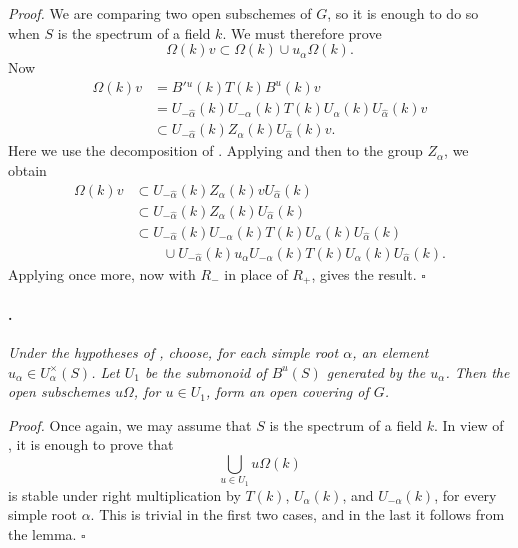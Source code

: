 \textit{Proof.}
We are comparing two open subschemes of \(G\), so it is enough to do
so when \(S\) is the spectrum of a field \(k\). We must therefore
prove
\[
  \Omega(k)v\subset\Omega(k)\cup u_\alpha\Omega(k).
\]
Now
\[
\begin{aligned}
  \Omega(k)v
  &=B'{}^u(k)T(k)B^u(k)v\\
  &=U_{-\widehat\alpha}(k)U_{-\alpha}(k)T(k)
    U_\alpha(k)U_{\widehat\alpha}(k)v\\
  &\subset
    U_{-\widehat\alpha}(k)Z_\alpha(k)
    U_{\widehat\alpha}(k)v.
\end{aligned}
\]
Here we use the decomposition of . Applying 
\textup{} and then  to the group \(Z_\alpha\), we obtain
\[
\begin{aligned}
  \Omega(k)v
  &\subset
    U_{-\widehat\alpha}(k)Z_\alpha(k)v
    U_{\widehat\alpha}(k)\\
  &\subset
    U_{-\widehat\alpha}(k)Z_\alpha(k)
    U_{\widehat\alpha}(k)\\
  &\subset
    U_{-\widehat\alpha}(k)U_{-\alpha}(k)T(k)
    U_\alpha(k)U_{\widehat\alpha}(k)\\
  &\qquad\cup
    U_{-\widehat\alpha}(k)u_\alpha U_{-\alpha}(k)T(k)
    U_\alpha(k)U_{\widehat\alpha}(k).
\end{aligned}
\]
Applying  \textup{} once more, now with \(R_-\) in place
of \(R_+\), gives the result.
\hfill\(\square\)

\paragraph{.}
\textit{Under the hypotheses of , choose, for each simple
root \(\alpha\), an element
\(u_\alpha\in U_\alpha^\times(S)\). Let \(U_1\) be the submonoid of
\(B^u(S)\) generated by the \(u_\alpha\). Then the open subschemes
\(u\Omega\), for \(u\in U_1\), form an open covering of \(G\).}

\textit{Proof.}
Once again, we may assume that \(S\) is the spectrum of a field
\(k\). In view of , it is enough to prove that
\[
  \bigcup_{u\in U_1}u\Omega(k)
\]
is stable under right multiplication by \(T(k)\), \(U_\alpha(k)\),
and \(U_{-\alpha}(k)\), for every simple root \(\alpha\). This is
trivial in the first two cases, and in the last it follows from the
lemma.
\hfill\(\square\)

